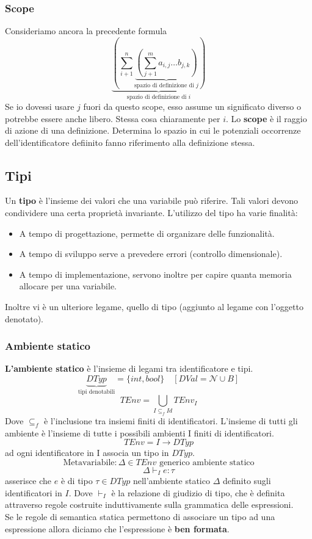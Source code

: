 \documentclass[a4paper]{article}
\begin{document}
\subsubsection{Scope}

Consideriamo ancora la precedente formula
\[
  \underbrace{\left(\sum_{i+1}^{n}\underbrace{\left(\sum_{j+1}^m a_{i,j} \dots b_{j,k}\right)}_{\text{spazio di
   definizione di $j$}}\right)}_{\text{spazio di definizione di $i$}}
\]
Se io dovessi usare $j$ fuori da questo scope, esso assume un significato diverso o 
potrebbe essere anche libero. Stessa cosa chiaramente per $i$.
{
  Lo \textbf{scope} è il raggio di azione di una definizione.
  Determina lo spazio in cui le potenziali occorrenze dell'identificatore
  defiinito fanno riferimento alla definizione stessa.
}

\subsection{Tipi}

Un \textbf{tipo} è l'insieme dei valori che una variabile può riferire.
Tali valori devono condividere una certa proprietà invariante.
L'utilizzo del tipo ha varie finalità:
\begin{itemize}
  \item A tempo di progettazione, permette di organizare delle funzionalità.
  \item A tempo di sviluppo serve a prevedere errori (controllo dimensionale).
  \item A tempo di implementazione, servono inoltre per capire quanta memoria allocare per una variabile.
\end{itemize}
Inoltre vi è un ulteriore legame, quello di tipo (aggiunto al legame con l'oggetto denotato).

\subsubsection{Ambiente statico}

\textbf{L'ambiente statico} è l'insieme di legami tra identificatore e tipi.
\[
  \underbrace{DTyp}_{\text{tipi denotabili}} = \{int, bool\} \quad [DVal = \mathcal{N} \cup B]
\]
\[
  TEnv = \bigcup_{I \subseteq_f Id} TEnv_I 
\]
Dove $\subseteq_f$ è l'inclusione tra insiemi finiti di identificatori.
L'insieme di tutti gli ambiente è l'insieme di tutte i possibili ambienti I finiti di identificatori.
\[
  TEnv = I \to DTyp
\]
ad ogni identificatore in I associa un tipo in $DTyp$.
\[\text{Metavariabile} : \Delta \in TEnv \text{ generico ambiente statico}\]
\[
  \Delta \vdash_I e : \tau 
\]
asserisce che $e$ è di tipo $\tau \in DTyp$ nell'ambiente statico $\Delta$
definito sugli identificatori in $I$.
Dove $\vdash_I$ è la relazione di giudizio di tipo, che è definita attraverso regole 
costruite induttivamente sulla grammatica delle espressioni.\\
Se le regole di semantica statica permettono di associare 
un tipo ad una espressione allora diciamo che 
l'espressione è \textbf{ben formata}.
\end{document}
